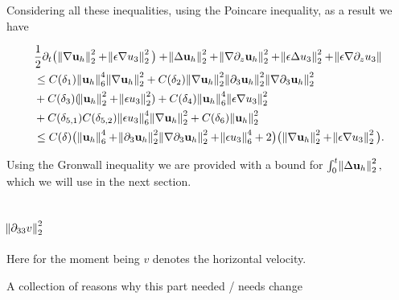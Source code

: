 \documentclass[11pt]{article}
\begin{document}
Considering all these inequalities, using the Poincare inequality, as a result we have

\begin{equation}
  \begin{split}
& \frac{1}{2} \partial_t  \big( \norm{\nabla \mathbf{u}_h}^2_2 + \norm{\epsilon \nabla u_3}^2_2 \big ) + \norm{\Delta \mathbf{u}_h}^2_2 + \norm{\nabla \partial_z \mathbf{u}_h}^2_2 + \norm{\epsilon \Delta u_3}^2_2 + \norm{\epsilon \nabla \partial_z u_3} \\
& \leq C(\delta_1) \norm{\mathbf{u}_h}^4_6 \norm{\nabla \mathbf{u}_h}_2^2 + C(\delta_2) \norm{\nabla \mathbf{u}_h}_2^2 \norm{\partial_3 \mathbf{u}_h}^2_2 \norm{\nabla \partial_3 \mathbf{u}_h}^2_2 \\
& + C(\delta_3) (\norm{ \mathbf{u}_h}^2_2 + \norm{ \epsilon u_3}^2_2) + C(\delta_4) \norm{\mathbf{u}_h}^4_6 \norm{\epsilon \nabla u_3}^2_2 \\
& + C(\delta_{5,1}) C(\delta_{5,2}) \norm{\epsilon u_3}^4_6 \norm{\nabla \mathbf{u}_h}^2_2 + C(\delta_6) \norm{\mathbf{u}_h}_2^2 \\
& \leq C(\delta) \big ( \norm{\mathbf{u}_h}^4_6 +\norm{\partial_3 \mathbf{u}_h}^2_2 \norm{\nabla \partial_3 \mathbf{u}_h}^2_2 + \norm{\epsilon u_3}^4_6 + 2 \big) \big( \norm{\nabla \mathbf{u}_h}^2_2 + \norm{\epsilon \nabla u_3}^2_2 \big ).
  \end{split}
\end{equation}

Using the Gronwall inequality we are provided with a bound for $\int_0^t \norm{\Delta \mathbf{u}_h}^2_2,$ which we will use in the next section.

\subsection{$\norm{\partial_{33}v}_2^2$}

Here for the moment being $v$ denotes the horizontal velocity.

A collection of reasons why this part needed / needs change
\end{document}
